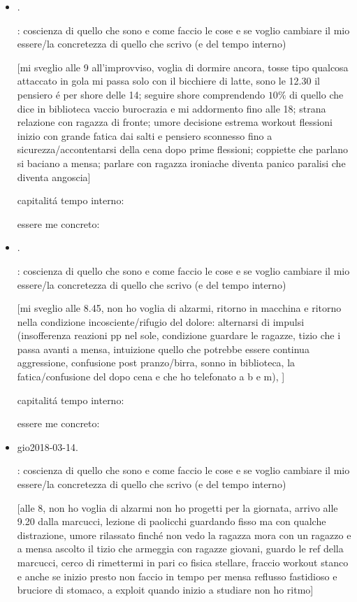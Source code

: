 \begin{itemize}
capitalit\'a tempo interno:

essere me concreto: 

\item {}.

: coscienza di quello che sono e come faccio le cose e se voglio cambiare il mio essere/la concretezza di quello che scrivo (e del tempo interno)

[mi sveglio alle 9 all'improvviso, voglia di dormire ancora, tosse tipo qualcosa attaccato in gola mi passa solo con il bicchiere di latte, sono le 12.30 il pensiero \'e per shore delle 14; seguire shore comprendendo $10\%$ di quello che dice in biblioteca vaccio burocrazia e mi addormento fino alle 18; strana relazione con ragazza di fronte; umore decisione estrema workout flessioni inizio con grande fatica dai salti e pensiero sconnesso fino a sicurezza/accontentarsi della cena dopo prime flessioni; coppiette che parlano si baciano a mensa; parlare con ragazza ironiache diventa panico paralisi che diventa angoscia]

capitalit\'a tempo interno:

essere me concreto: 

\item {}.

: coscienza di quello che sono e come faccio le cose e se voglio cambiare il mio essere/la concretezza di quello che scrivo (e del tempo interno)

[mi sveglio alle 8.45, non ho voglia di alzarmi, ritorno in macchina e ritorno nella condizione incosciente/rifugio del dolore: alternarsi di impulsi (insofferenza reazioni pp nel sole, condizione guardare le ragazze, tizio che i passa avanti a mensa, intuizione quello che potrebbe essere continua aggressione, confusione post pranzo/birra, sonno in biblioteca, la fatica/confusione del dopo cena e che ho telefonato a b e m), ]

capitalit\'a tempo interno:

essere me concreto: 

\item{gio}{2018-03-14}.

: coscienza di quello che sono e come faccio le cose e se voglio cambiare il mio essere/la concretezza di quello che scrivo (e del tempo interno)

[alle 8, non ho voglia di alzarmi non ho progetti per la giornata, arrivo alle 9.20 dalla marcucci, lezione di paolicchi guardando fisso ma con qualche distrazione, umore rilassato finch\'e non vedo la ragazza mora con un ragazzo e a mensa ascolto il tizio che armeggia con ragazze giovani, guardo le ref della marcucci, cerco di rimettermi in pari co fisica stellare, fraccio workout stanco e anche se inizio presto non faccio in tempo per mensa reflusso fastidioso e bruciore di stomaco, a exploit quando inizio a studiare non ho ritmo]


\end{itemize}
